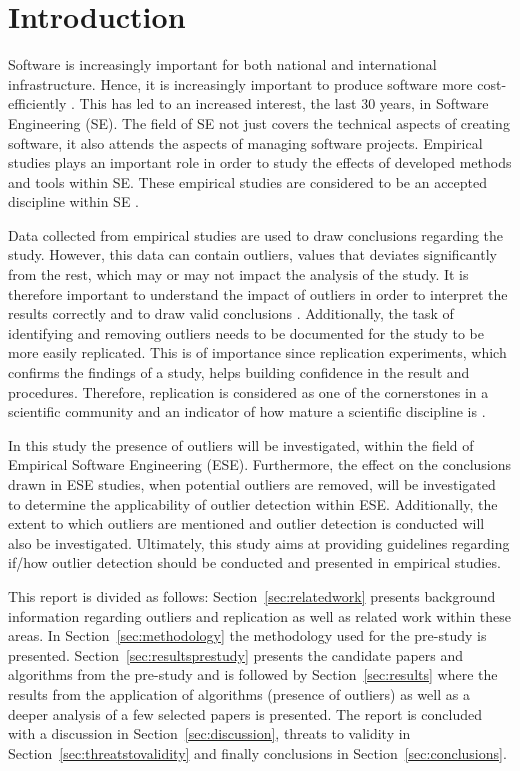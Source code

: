 ﻿\section{Introduction}
\label{sec:introduction}




Software is increasingly important for both national and international infrastructure. Hence, it is increasingly important to produce software more cost-efficiently \citep{sommerville2006software}. This has led to an increased interest, the last 30 years, in Software Engineering (SE). The field of SE not just covers the technical aspects of creating software, it also attends the aspects of managing software projects. Empirical studies plays an important role in order to study the effects of developed methods and tools within SE. These empirical studies are considered to be an accepted discipline within SE \citep{ko2013practical}. 


Data collected from empirical studies are used to draw conclusions regarding the study. However, this data can contain outliers, values that deviates significantly from the rest, which may or may not impact the analysis of the study. It is therefore important to understand the impact of outliers in order to interpret the results correctly and to draw valid conclusions \citep{kriegel2008angle}. Additionally, the task of identifying and removing outliers needs to be documented for the study to be more easily replicated. This is of importance since replication experiments, which confirms the findings of a study, helps building confidence in the result and procedures. Therefore, replication is considered as one of the cornerstones in a scientific community and an indicator of how mature a scientific discipline is \citep{brooks2008replication}.


In this study the presence of outliers will be investigated, within the field of Empirical Software Engineering (ESE)\@. Furthermore, the effect on the conclusions drawn in ESE studies, when potential outliers are removed, will be investigated to determine the applicability of outlier detection within ESE\@. Additionally, the extent to which outliers are mentioned and outlier detection is conducted will also be investigated. Ultimately, this study aims at providing guidelines regarding if\slash how outlier detection should be conducted and presented in empirical studies.


This report is divided as follows: Section~\ref{sec:relatedwork} presents background information regarding outliers and replication as well as related work within these areas. In Section~\ref{sec:methodology} the methodology used for the pre-study is presented. Section~\ref{sec:resultsprestudy} presents the candidate papers and algorithms from the pre-study and is followed by Section~\ref{sec:results} where the results from the application of algorithms (presence of outliers) as well as a deeper analysis of a few selected papers is presented. The report is concluded with a discussion in Section~\ref{sec:discussion}, threats to validity in Section~\ref{sec:threatstovalidity} and finally conclusions in Section~\ref{sec:conclusions}.




